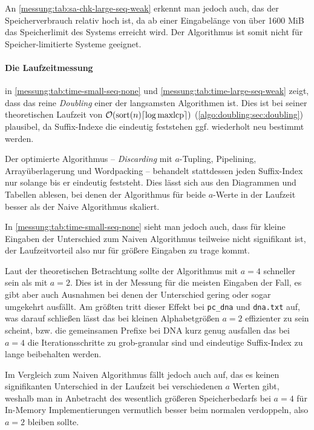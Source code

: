 An \cref{messung:tab:sa-chk-large-seq-weak} erkennt man jedoch auch, das der Speicherverbrauch relativ hoch ist, da ab einer Eingabelänge von über 1600 MiB das Speicherlimit des Systems erreicht wird. Der Algorithmus ist somit nicht für Speicher-limitierte Systeme geeignet.

\paragraph{Die Laufzeitmessung} in \cref{messung:tab:time-small-seq-none} und  \cref{messung:tab:time-large-seq-weak} zeigt, dass das reine \textit{Doubling} einer der langsamsten Algorithmen ist. Dies ist bei seiner theoretischen Laufzeit von $\mathcal{O}(\text{sort}(n) \ceil*{\log \text{maxlcp}})$ (\cref{algo:doubling:sec:doubling}) plausibel, da Suffix-Indexe die eindeutig feststehen ggf. wiederholt neu bestimmt werden.

Der optimierte Algorithmus -- \textit{Discarding} mit $a$-Tupling, Pipelining, Arrayüberlagerung und Wordpacking -- behandelt stattdessen jeden Suffix-Index nur solange bis er eindeutig feststeht. Dies lässt sich aus den Diagrammen und Tabellen ablesen, bei denen der Algorithmus für beide $a$-Werte in der Laufzeit besser als der Naive Algorithmus skaliert.

In \cref{messung:tab:time-small-seq-none} sieht man jedoch auch, dass für kleine Eingaben der Unterschied zum Naiven Algorithmus teilweise nicht signifikant ist, der Laufzeitvorteil also nur für größere Eingaben zu trage kommt.

Laut der theoretischen Betrachtung sollte der Algorithmus mit $a=4$ schneller sein als mit $a=2$. Dies ist in der Messung für die meisten Eingaben der Fall, es gibt aber auch Ausnahmen bei denen der Unterschied gering oder sogar umgekehrt ausfällt. Am größten tritt dieser Effekt bei \texttt{pc\_dna} und \texttt{dna.txt} auf, was darauf schließen lässt das bei kleinen Alphabetgrößen $a=2$ effizienter zu sein scheint, bzw. die gemeinsamen Prefixe bei DNA kurz genug ausfallen das bei $a=4$ die Iterationsschritte zu grob-granular sind und eindeutige Suffix-Index zu lange beibehalten werden.

Im Vergleich zum Naiven Algorithmus fällt jedoch auch auf, das es keinen signifikanten Unterschied in der Laufzeit bei verschiedenen $a$ Werten gibt, weshalb man in Anbetracht des wesentlich größeren Speicherbedarfs bei $a=4$ für In-Memory Implementierungen vermutlich besser beim normalen verdoppeln, also $a=2$ bleiben sollte.

